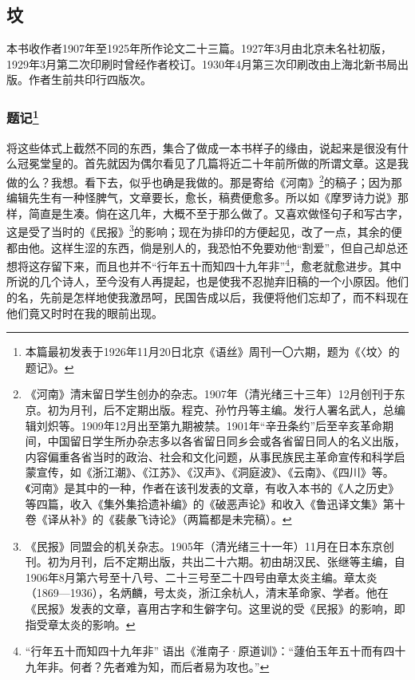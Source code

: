\subsection{坟}

本书收作者1907年至1925年所作论文二十三篇。1927年3月由北京未名社初版，1929年3月第二次印刷时曾经作者校订。1930年4月第三次印刷改由上海北新书局出版。作者生前共印行四版次。


\subsubsection*{题记\footnote{本篇最初发表于1926年11月20日北京《语丝》周刊一〇六期，题为《〈坟〉的题记》。}}


\par 将这些体式上截然不同的东西，集合了做成一本书样子的缘由，说起来是很没有什么冠冕堂皇的。首先就因为偶尔看见了几篇将近二十年前所做的所谓文章。这是我做的么？我想。看下去，似乎也确是我做的。那是寄给《河南》\footnote{《河南》清末留日学生创办的杂志。1907年（清光绪三十三年）12月创刊于东京。初为月刊，后不定期出版。程克、孙竹丹等主编。发行人署名武人，总编辑刘炽等。1909年12月出至第九期被禁。1901年“辛丑条约”后至辛亥革命期间，中国留日学生所办杂志多以各省留日同乡会或各省留日同人的名义出版，内容偏重各省当时的政治、社会和文化问题，从事民族民主革命宣传和科学启蒙宣传，如《浙江潮》、《江苏》、《汉声》、《洞庭波》、《云南》、《四川》等。《河南》是其中的一种，作者在该刊发表的文章，有收入本书的《人之历史》等四篇，收入《集外集拾遗补编》的《破恶声论》和收入《鲁迅译文集》第十卷《译从补》的《裴彖飞诗论》（两篇都是未完稿）。}的稿子；因为那编辑先生有一种怪脾气，文章要长，愈长，稿费便愈多。所以如《摩罗诗力说》那样，简直是生凑。倘在这几年，大概不至于那么做了。又喜欢做怪句子和写古字，这是受了当时的《民报》\footnote{《民报》同盟会的机关杂志。1905年（清光绪三十一年）11月在日本东京创刊。初为月刊，后不定期出版，共出二十六期。初由胡汉民、张继等主编，自1906年8月第六号至十八号、二十三号至二十四号由章太炎主编。章太炎（1869—1936），名炳麟，号太炎，浙江余杭人，清末革命家、学者。他在《民报》发表的文章，喜用古字和生僻字句。这里说的受《民报》的影响，即指受章太炎的影响。}的影响；现在为排印的方便起见，改了一点，其余的便都由他。这样生涩的东西，倘是别人的，我恐怕不免要劝他“割爱”，但自己却总还想将这存留下来，而且也并不“行年五十而知四十九年非”\footnote{“行年五十而知四十九年非” 语出《淮南子·原道训》：“蘧伯玉年五十而有四十九年非。何者？先者难为知，而后者易为攻也。”}，愈老就愈进步。其中所说的几个诗人，至今没有人再提起，也是使我不忍抛弃旧稿的一个小原因。他们的名，先前是怎样地使我激昂呵，民国告成以后，我便将他们忘却了，而不料现在他们竟又时时在我的眼前出现。
